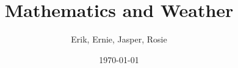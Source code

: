 \documentclass[14pt, a1paper, landscape]{tikzposter}
\title{Mathematics and Weather}
\author{Erik, Ernie, Jasper, Rosie}
\date{\today}
\institute{Cambridge Maths School}
\begin{document}
\maketitle

\newcommand\inlineeqno{\hspace{0.5em} \stepcounter{equation}\ (\theequation) \hspace{1.5em} }
\renewenvironment{tikzfigure}[1][]{
  \def \rememberparameter{#1}
  \vspace{10pt}
  \refstepcounter{figurecounter}
  \begin{center}
  }{
    \ifx\rememberparameter\@empty
    \else %
    \\[10pt]
    {\small \rememberparameter}
    \fi
  \end{center}
}

\end{document}

